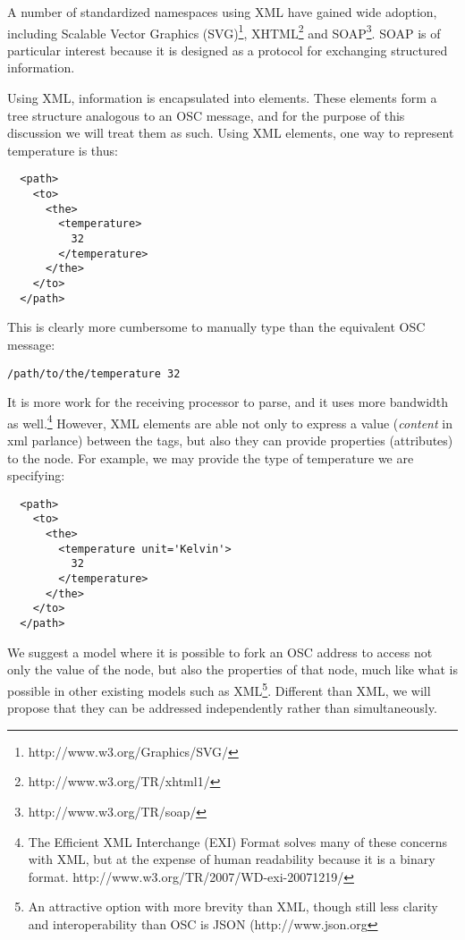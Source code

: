 \documentclass{NIME-alternate}
\begin{document}

A number of standardized namespaces using XML have gained wide adoption, including Scalable Vector Graphics (SVG)\footnote{http://www.w3.org/Graphics/SVG/}, XHTML\footnote{http://www.w3.org/TR/xhtml1/} and SOAP\footnote{http://www.w3.org/TR/soap/}.  SOAP is of particular interest because it is designed as a protocol for exchanging structured information.

Using XML, information is encapsulated into elements.  These elements form a tree structure analogous to an OSC message, and for the purpose of this discussion we will treat them as such.  Using XML elements, one way to represent temperature is thus:

\begin{lstlisting}
  <path>
    <to>
      <the>
        <temperature> 
          32
        </temperature>
      </the>
    </to>
  </path>
\end{lstlisting}

This is clearly more cumbersome to manually type than the equivalent OSC message:

\noindent
\texttt{/path/to/the/temperature 32}

It is more work for the receiving processor to parse, and it uses more bandwidth as well.\footnote{The Efficient XML Interchange (EXI) Format solves many of these concerns with XML, but at the expense of human readability because it is a binary format.  http://www.w3.org/TR/2007/WD-exi-20071219/} However, XML elements are able not only to express a value (\emph{content} in xml parlance) between the tags, but also they can provide properties (attributes) to the node. For example, we may provide the type of temperature we are specifying:

\begin{lstlisting}
  <path>
    <to>
      <the>
        <temperature unit='Kelvin'>
          32
        </temperature>
      </the>
    </to>
  </path>
\end{lstlisting}

We suggest a model where it is possible to fork an OSC address to access not only the value of the node, but also the properties of that node, much like what is possible in other existing models such as XML\footnote{An attractive option with more brevity than XML, though still less clarity and interoperability than OSC is JSON (http://www.json.org}.  Different than XML, we will propose that they can be addressed independently rather than simultaneously.
\end{document}
